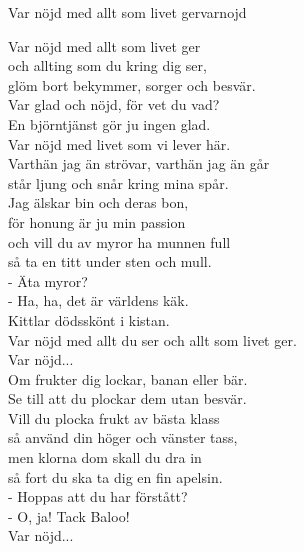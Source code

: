 \begin{song}{Var nöjd med allt som livet ger}{varnojd}
\begin{vers}
Var nöjd med allt som livet ger \\
och allting som du kring dig ser,\\
glöm bort bekymmer, sorger och besvär. \\
Var glad och nöjd, för vet du vad? \\
En björntjänst gör ju ingen glad.\\
Var nöjd med livet som vi lever här. \\
Varthän jag än strövar, varthän jag än går \\
står ljung och snår kring mina spår. \\
Jag älskar bin och deras bon, \\
för honung är ju min passion\\
och vill du av myror ha munnen full \\
så ta en titt under sten och mull.\\
- Äta myror?\\
- Ha, ha, det är världens käk.\\
Kittlar dödsskönt i kistan. \\
Var nöjd med allt du ser och allt som livet ger.\\
Var nöjd...\\
Om frukter dig lockar, banan eller bär.\\
Se till att du plockar dem utan besvär. \\
Vill du plocka frukt av bästa klass \\
så använd din höger och vänster tass, \\
men klorna dom skall du dra in\\
så fort du ska ta dig en fin apelsin.\\
- Hoppas att du har förstått?\\
- O, ja! Tack Baloo!\\
Var nöjd...\\
\end{vers}
\end{song}
